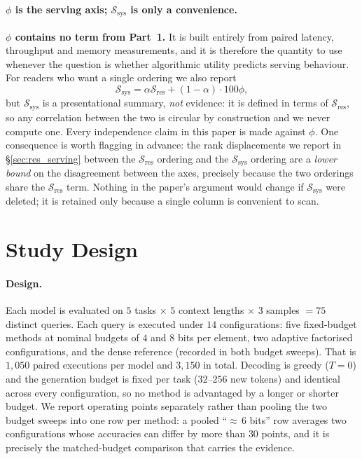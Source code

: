 \documentclass[sigplan,10pt,anonymous,review,nonacm]{acmart}
\newcommand{\Sres}{\mathcal{S}_{\text{res}}}
\newcommand{\Ssys}{\mathcal{S}_{\text{sys}}}
\begin{document}
\paragraph{$\phi$ is the serving axis; $\Ssys$ is only a convenience.}
\textbf{$\phi$ contains no term from Part~1.} It is built entirely from
paired latency, throughput and memory measurements, and it is therefore the
quantity to use whenever the question is whether algorithmic utility predicts
serving behaviour. For readers who want a single ordering we also report
\begin{equation}
\label{eq:ssys}
\Ssys = \alpha \Sres + (1-\alpha) \cdot 100\phi ,
\end{equation}
but $\Ssys$ is a presentational summary, \emph{not} evidence: it is defined in
terms of $\Sres$, so any correlation between the two is circular by
construction and we never compute one. Every independence claim in this paper
is made against $\phi$. One consequence is worth flagging in advance: the
rank displacements we report in \S\ref{sec:res_serving} between the $\Sres$
ordering and the $\Ssys$ ordering are a \emph{lower bound} on the disagreement
between the axes, precisely because the two orderings share the $\Sres$ term.
Nothing in the paper's argument would change if $\Ssys$ were deleted; it is
retained only because a single column is convenient to scan.

\section{Study Design}
\label{sec:setup}

\paragraph{Design.}
Each model is evaluated on $5$ tasks $\times$ $5$ context lengths $\times$ $3$
samples $= 75$ distinct queries. Each query is executed under $14$
configurations: five fixed-budget methods at nominal budgets of $4$ and $8$
bits per element, two adaptive factorised configurations, and the dense
reference (recorded in both budget sweeps). That is $1{,}050$ paired
executions per model and $3{,}150$ in total. Decoding is greedy ($T=0$) and
the generation budget is fixed per task ($32$--$256$ new tokens) and identical
across every configuration, so no method is advantaged by a longer or shorter
budget. We report operating points separately rather than pooling the two
budget sweeps into one row per method: a pooled ``$\approx$\,6 bits'' row
averages two configurations whose accuracies can differ by more than $30$
points, and it is precisely the matched-budget comparison that carries the
evidence.
\end{document}
